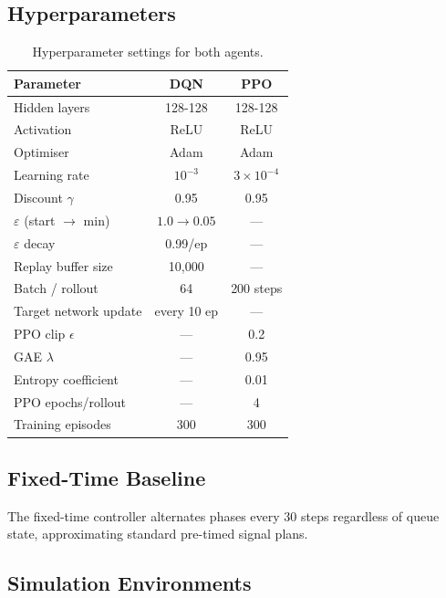 \documentclass[twoside,11pt]{article}
\begin{document}
\subsection{Hyperparameters}

\begin{table}[H]
\centering
\caption{Hyperparameter settings for both agents.}
\label{tab:hyper}
\begin{tabular}{lcc}
\toprule
\textbf{Parameter} & \textbf{DQN} & \textbf{PPO} \\
\midrule
Hidden layers       & 128-128      & 128-128 \\
Activation          & ReLU         & ReLU \\
Optimiser           & Adam         & Adam \\
Learning rate       & $10^{-3}$    & $3\times10^{-4}$ \\
Discount $\gamma$   & 0.95         & 0.95 \\
$\varepsilon$ (start $\to$ min) & $1.0 \to 0.05$ & — \\
$\varepsilon$ decay & 0.99/ep      & — \\
Replay buffer size  & 10,000       & — \\
Batch / rollout     & 64           & 200 steps \\
Target network update & every 10 ep & — \\
PPO clip $\epsilon$ & —            & 0.2 \\
GAE $\lambda$       & —            & 0.95 \\
Entropy coefficient & —            & 0.01 \\
PPO epochs/rollout  & —            & 4 \\
Training episodes   & 300          & 300 \\
\bottomrule
\end{tabular}
\end{table}

\subsection{Fixed-Time Baseline}

The fixed-time controller alternates phases every 30 steps regardless of queue
state, approximating standard pre-timed signal plans.

\subsection{Simulation Environments}
\end{document}
